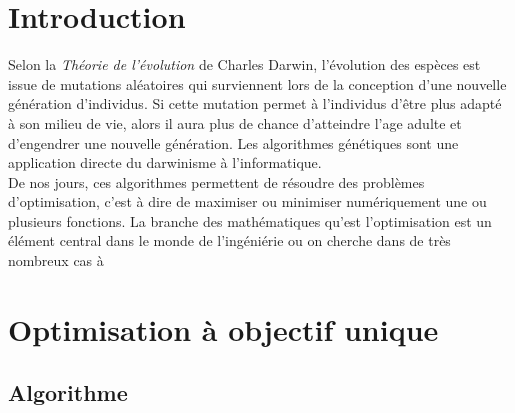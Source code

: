 \documentclass[12pt]{report}
\begin{document}
  \chapter{Introduction}
    Selon la \emph{Théorie de l'évolution} \cite{darwin} de Charles Darwin, l'évolution des espèces est issue de mutations aléatoires qui surviennent lors de la conception d'une nouvelle génération d'individus. Si cette mutation permet à l'individus d'être plus adapté à son milieu de vie, alors il aura plus de chance d'atteindre l'age adulte et d'engendrer une nouvelle génération.
    Les algorithmes génétiques sont une application directe du darwinisme à l'informatique.\\
    De nos jours, ces algorithmes permettent de résoudre des problèmes d'optimisation, c'est à dire de maximiser ou minimiser numériquement une ou plusieurs fonctions.
    La branche des mathématiques qu'est l'optimisation est un élément central dans le monde de l'ingéniérie ou on cherche dans de très nombreux cas à


  \tableofcontents

  \chapter{Optimisation à objectif unique}
    \section{Algorithme}
\end{document}
